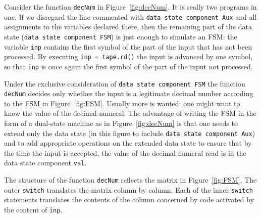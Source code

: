 \documentclass[preprint,11pt]{elsarticle}
\begin{document}
Consider the function \verb"decNum" in Figure~\ref{fig:decNum}.
It is really two programs in one.
If we disregard the line commented with
\verb"data state component Aux" and all assignments to the variables
declared there,
then the remaining part of the data state (\verb"data state component FSM")
is just enough to simulate an FSM:
the variable \verb"inp" contains the first symbol of the
part of the input that has not been processed.
By executing \verb"inp = tape.rd()" the input is advanced by
one symbol,
so that \verb"inp" is once again the first symbol
of the part of the input not processed.

Under the exclusive consideration of
\verb"data state component FSM" the function \verb"decNum"
decides only whether the input is a legitimate decimal number
according to the FSM in Figure~\ref{fig:FSM}.
Usually more is wanted: one might want to know
the value of the decimal numeral.
The advantage of writing the FSM in the form
of a dual-state machine as in Figure~\ref{fig:decNum} is that
one needs to extend only the data state (in this figure to include
\verb"data state component Aux")
and to add appropriate operations
on the extended data state to ensure
that by the time the input is accepted,
the value of the decimal numeral read
is in the data state component \verb"val".

The structure of the function \verb"decNum" reflects the
matrix in Figure~\ref{fig:FSM}.
The outer \verb"switch" translates the matrix column by
column.
Each of the inner \verb"switch" statements translates
the contents of the column concerned by code activated
by the content of \verb"inp".
\end{document}
